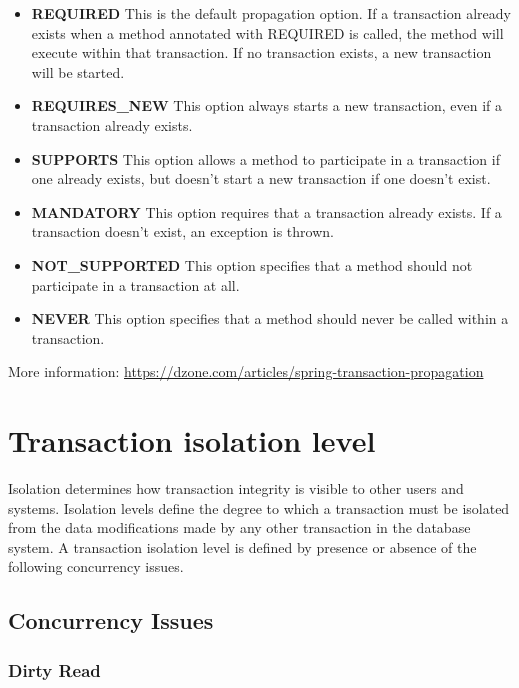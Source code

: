 \begin{itemize}
\item \textbf{REQUIRED} This is the default propagation option. If a transaction already exists when a method annotated with REQUIRED is called, the method will execute within that transaction. If no transaction exists, a new transaction will be started.

\item \textbf{REQUIRES_NEW} This option always starts a new transaction, even if a transaction already exists.

\item \textbf{SUPPORTS} This option allows a method to participate in a transaction if one already exists, but doesn’t start a new transaction if one doesn’t exist.

\item \textbf{MANDATORY} This option requires that a transaction already exists. If a transaction doesn’t exist, an exception is thrown.

\item \textbf{NOT_SUPPORTED} This option specifies that a method should not participate in a transaction at all.

\item \textbf{NEVER} This option specifies that a method should never be called within a transaction.
\end{itemize}

More information: \url{https://dzone.com/articles/spring-transaction-propagation}

\section{Transaction isolation level}

Isolation determines how transaction integrity is visible to other users and systems.
Isolation levels define the degree to which a transaction must be isolated from the data modifications made by any other transaction in the database system. A transaction isolation level is defined by presence or absence of the following concurrency issues. 

\subsection{Concurrency Issues}

\subsubsection{Dirty Read}

